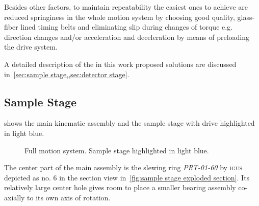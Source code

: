         Besides other factors, to maintain repeatability the easiest ones to achieve are reduced springiness in the whole motion system by choosing good quality, glass-fiber lined timing belts and eliminating slip during changes of torque e.g. direction changes and/or acceleration and deceleration by means of preloading the drive system.\par\medskip

        A detailed description of the in this work proposed solutions are discussed in~\cref{sec:sample stage,,sec:detector stage}.
        
        \subsection{Sample Stage}\label{sec:sample stage}
             shows the main kinematic assembly and the sample stage with drive highlighted in light blue.
            \begin{figure}[ht]
                \centering
                \caption[Full motion system. Sample stage blue highlighted.]{Full motion system. Sample stage highlighted in light blue.}%
                \label{fig:xmagix full sample highlightes}%
            \end{figure}%

            The center part of the main assembly is the slewing ring \textit{PRT-01-60} by \textsc{igus}~\cite{Manual.IglidePRTPolymerSlewingRings.} depicted as no. 6 in the section view in~\cref{fig:sample stage exploded section}.
            Its relatively large center hole gives room to place a smaller bearing assembly co-axially to its own axis of rotation.\par\medskip

